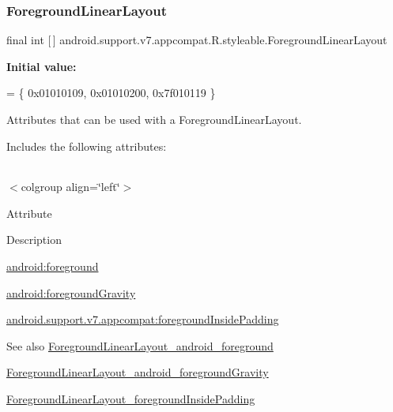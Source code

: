 \subsubsection{\texorpdfstring{Foreground\+Linear\+Layout}{ForegroundLinearLayout}}
{\footnotesize\ttfamily final int \mbox{[}$\,$\mbox{]} android.\+support.\+v7.\+appcompat.\+R.\+styleable.\+Foreground\+Linear\+Layout\hspace{0.3cm}{\ttfamily [static]}}

{\bfseries Initial value\+:}
\begin{DoxyCode}
= \{
            0x01010109, 0x01010200, 0x7f010119
        \}
\end{DoxyCode}
Attributes that can be used with a Foreground\+Linear\+Layout. 

Includes the following attributes\+:

\tabulinesep=1mm
\begin{longtabu} spread 0pt [c]{*{0}{|X[-1]}|}
\hline
\end{longtabu}
$<$colgroup align=\char`\"{}left\char`\"{}$>$ 

Attribute

Description 

{\ttfamily \hyperlink{classandroid_1_1support_1_1v7_1_1appcompat_1_1R_1_1styleable_af337e2da4a51b19cc581fe21e3ed35bc}{android\+:foreground}}

{\ttfamily \hyperlink{classandroid_1_1support_1_1v7_1_1appcompat_1_1R_1_1styleable_ac69a29699eef83027666506239d7956a}{android\+:foreground\+Gravity}}

{\ttfamily \hyperlink{classandroid_1_1support_1_1v7_1_1appcompat_1_1R_1_1styleable_ac64be02302c54871cc61d90fb2622959}{android.\+support.\+v7.\+appcompat\+:foreground\+Inside\+Padding}}

\begin{DoxySeeAlso}{See also}
\hyperlink{classandroid_1_1support_1_1v7_1_1appcompat_1_1R_1_1styleable_af337e2da4a51b19cc581fe21e3ed35bc}{Foreground\+Linear\+Layout\+\_\+android\+\_\+foreground} 

\hyperlink{classandroid_1_1support_1_1v7_1_1appcompat_1_1R_1_1styleable_ac69a29699eef83027666506239d7956a}{Foreground\+Linear\+Layout\+\_\+android\+\_\+foreground\+Gravity} 

\hyperlink{classandroid_1_1support_1_1v7_1_1appcompat_1_1R_1_1styleable_ac64be02302c54871cc61d90fb2622959}{Foreground\+Linear\+Layout\+\_\+foreground\+Inside\+Padding} 
\end{DoxySeeAlso}
\mbox{\label{classandroid_1_1support_1_1v7_1_1appcompat_1_1R_1_1styleable_af337e2da4a51b19cc581fe21e3ed35bc}} 
